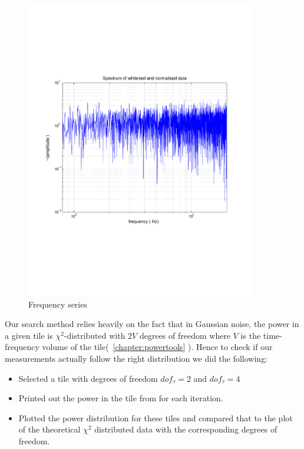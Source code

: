 \begin{figure}[h]
\begin{center}
\includegraphics[width=0.9\textwidth]{figures/freqseries_psd}
\caption{Frequency series}
\label{fig:gaussianfreqseries}
\end{center}
\end{figure}
 
Our search method relies heavily on the fact that in Gaussian noise, 
 the power in a given tile is $\chi^2$-distributed with 
$2 V$ degrees of freedom where $V$ is the time-frequency volume of the 
tile(~\ref{chapter:powertools} ).  Hence to check if our measurements 
actually follow the right distribution we did the following:
\begin{itemize}
\item Selected a tile with degrees of freedom $dof_{\tau} = 2$ and $dof_{\tau} = 4$
\item Printed out the power in the tile from for each iteration.
\item Plotted the power distribution for these tiles and compared that to the plot
      of the theoretical $\chi^2$ distributed data with the corresponding degrees of freedom. 
\end{itemize}

